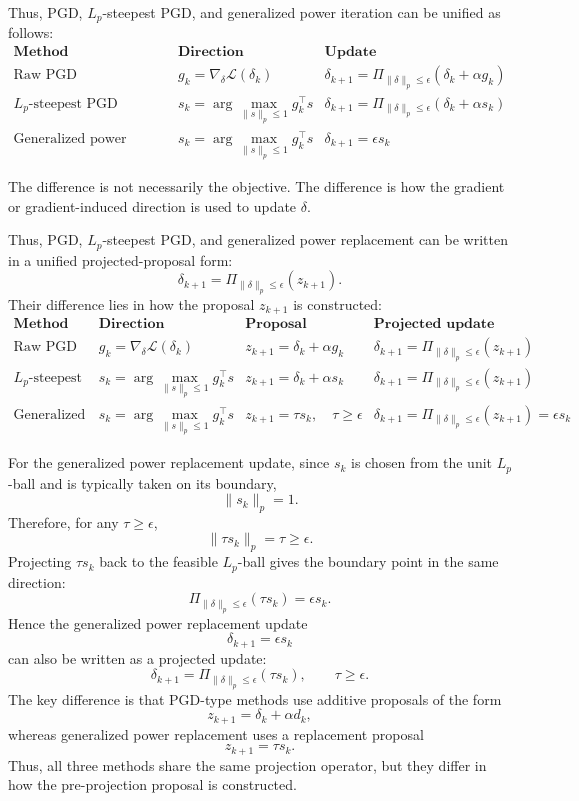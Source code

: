 \documentclass{article}
\begin{document}
Thus, PGD, $L_p$-steepest PGD, and generalized power iteration can be unified as follows:
\[
\begin{array}{c|c|c}
\textbf{Method}
&
\textbf{Direction}
&
\textbf{Update}
\\
\hline
\text{Raw PGD}
&
g_k=\nabla_\delta\mathcal L(\delta_k)
&
\delta_{k+1}
=
\Pi_{\|\delta\|_p\le\epsilon}
(\delta_k+\alpha g_k)
\\
\hline
L_p\text{-steepest PGD}
&
s_k=
\arg\max_{\|s\|_p\le1}g_k^\top s
&
\delta_{k+1}
=
\Pi_{\|\delta\|_p\le\epsilon}
(\delta_k+\alpha s_k)
\\
\hline
\text{Generalized power replacement}
&
s_k=
\arg\max_{\|s\|_p\le1}g_k^\top s
&
\delta_{k+1}
=
\epsilon s_k
\end{array}
\]

The difference is not necessarily the objective. The difference is how the gradient or gradient-induced direction is used to update $\delta$.

Thus, PGD, \(L_p\)-steepest PGD, and generalized power replacement can be written in a unified projected-proposal form:
\[
\delta_{k+1}
=
\Pi_{\|\delta\|_p\le\epsilon}(z_{k+1}).
\]
Their difference lies in how the proposal \(z_{k+1}\) is constructed:
\[
\begin{array}{c|c|c|c}
\textbf{Method}
&
\textbf{Direction}
&
\textbf{Proposal}
&
\textbf{Projected update}
\\
\hline
\text{Raw PGD}
&
g_k=\nabla_\delta\mathcal L(\delta_k)
&
z_{k+1}=\delta_k+\alpha g_k
&
\delta_{k+1}
=
\Pi_{\|\delta\|_p\le\epsilon}(z_{k+1})
\\
\hline
L_p\text{-steepest PGD}
&
s_k=
\arg\max_{\|s\|_p\le1}g_k^\top s
&
z_{k+1}=\delta_k+\alpha s_k
&
\delta_{k+1}
=
\Pi_{\|\delta\|_p\le\epsilon}(z_{k+1})
\\
\hline
\text{Generalized power replacement}
&
s_k=
\arg\max_{\|s\|_p\le1}g_k^\top s
&
z_{k+1}=\tau s_k,\quad \tau\ge\epsilon
&
\delta_{k+1}
=
\Pi_{\|\delta\|_p\le\epsilon}(z_{k+1})
=
\epsilon s_k
\end{array}
\]

For the generalized power replacement update, since \(s_k\) is chosen from the unit \(L_p\)-ball and is typically taken on its boundary,
\[
\|s_k\|_p=1.
\]
Therefore, for any \(\tau\ge\epsilon\),
\[
\|\tau s_k\|_p=\tau\ge\epsilon.
\]
Projecting \(\tau s_k\) back to the feasible \(L_p\)-ball gives the boundary point in the same direction:
\[
\Pi_{\|\delta\|_p\le\epsilon}(\tau s_k)
=
\epsilon s_k.
\]
Hence the generalized power replacement update
\[
\delta_{k+1}=\epsilon s_k
\]
can also be written as a projected update:
\[
\delta_{k+1}
=
\Pi_{\|\delta\|_p\le\epsilon}(\tau s_k),
\qquad
\tau\ge\epsilon.
\]
The key difference is that PGD-type methods use additive proposals of the form
\[
z_{k+1}=\delta_k+\alpha d_k,
\]
whereas generalized power replacement uses a replacement proposal
\[
z_{k+1}=\tau s_k.
\]
Thus, all three methods share the same projection operator, but they differ in how the pre-projection proposal is constructed.
\end{document}
